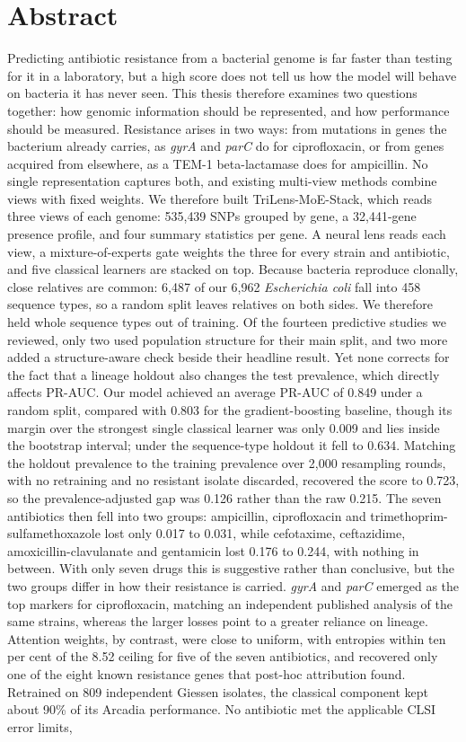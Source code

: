\section*{Abstract}

Predicting antibiotic resistance from a bacterial genome is far faster than testing for it in a laboratory, but a high score does not tell us how the model will behave on bacteria it has never seen. This thesis therefore examines two questions together: how genomic information should be represented, and how performance should be measured. Resistance arises in two ways: from mutations in genes the bacterium already carries, as \textit{gyrA} and \textit{parC} do for ciprofloxacin, or from genes acquired from elsewhere, as a TEM-1 beta-lactamase does for ampicillin. No single representation captures both, and existing multi-view methods combine views with fixed weights. We therefore built TriLens-MoE-Stack, which reads three views of each genome: 535{,}439 SNPs grouped by gene, a 32{,}441-gene presence profile, and four summary statistics per gene. A neural lens reads each view, a mixture-of-experts gate weights the three for every strain and antibiotic, and five classical learners are stacked on top. Because bacteria reproduce clonally, close relatives are common: 6{,}487 of our 6{,}962 \textit{Escherichia coli} fall into 458 sequence types, so a random split leaves relatives on both sides. We therefore held whole sequence types out of training. Of the fourteen predictive studies we reviewed, only two used population structure for their main split, and two more added a structure-aware check beside their headline result. Yet none corrects for the fact that a lineage holdout also changes the test prevalence, which directly affects PR-AUC. Our model achieved an average PR-AUC of 0.849 under a random split, compared with 0.803 for the gradient-boosting baseline, though its margin over the strongest single classical learner was only 0.009 and lies inside the bootstrap interval; under the sequence-type holdout it fell to 0.634. Matching the holdout prevalence to the training prevalence over 2{,}000 resampling rounds, with no retraining and no resistant isolate discarded, recovered the score to 0.723, so the prevalence-adjusted gap was 0.126 rather than the raw 0.215. The seven antibiotics then fell into two groups: ampicillin, ciprofloxacin and trimethoprim-sulfamethoxazole lost only 0.017 to 0.031, while cefotaxime, ceftazidime, amoxicillin-clavulanate and gentamicin lost 0.176 to 0.244, with nothing in between. With only seven drugs this is suggestive rather than conclusive, but the two groups differ in how their resistance is carried. \textit{gyrA} and \textit{parC} emerged as the top markers for ciprofloxacin, matching an independent published analysis of the same strains, whereas the larger losses point to a greater reliance on lineage. Attention weights, by contrast, were close to uniform, with entropies within ten per cent of the 8.52 ceiling for five of the seven antibiotics, and recovered only one of the eight known resistance genes that post-hoc attribution found. Retrained on 809 independent Giessen isolates, the classical component kept about 90\% of its Arcadia performance. No antibiotic met the applicable CLSI error limits, 